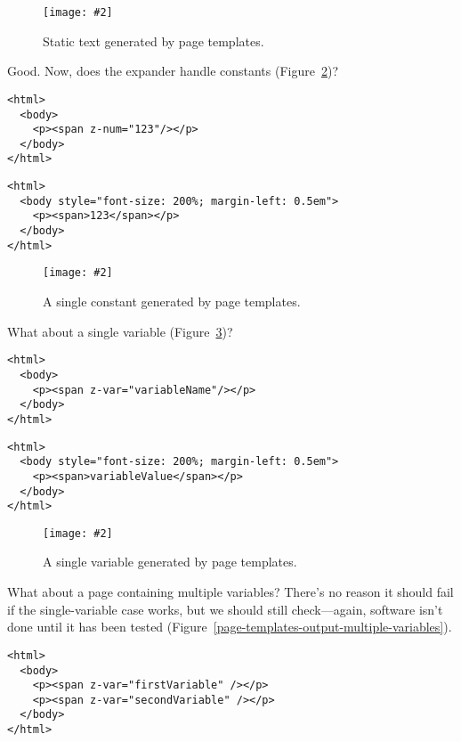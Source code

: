 \documentclass[krantzl]{krantz}
\newcommand{\figpdf}[4]{\begin{figure}%
\centering%
\texttt{[image: \#2]}%
\caption{#3}%
\label{#1}%
\end{figure}}
\newcommand{\figref}[1]{Figure~\ref{#1}}
\begin{document}
\figpdf{page-templates-output-static-text}{./page-templates/output-static-text.pdf}{Static text generated by page templates.}{0.6}


Good.
Now, does the expander handle constants (\figref{page-templates-output-single-constant})?


\begin{lstlisting}[frame=single,frameround=tttt]
<html>
  <body>
    <p><span z-num="123"/></p>
  </body>
</html>
\end{lstlisting}



\begin{lstlisting}[frame=single,frameround=tttt]
<html>
  <body style="font-size: 200%; margin-left: 0.5em">
    <p><span>123</span></p>
  </body>
</html>
\end{lstlisting}


\figpdf{page-templates-output-single-constant}{./page-templates/output-single-constant.pdf}{A single constant generated by page templates.}{0.6}


What about a single variable (\figref{page-templates-output-single-variable})?


\begin{lstlisting}[frame=single,frameround=tttt]
<html>
  <body>
    <p><span z-var="variableName"/></p>
  </body>
</html>
\end{lstlisting}



\begin{lstlisting}[frame=single,frameround=tttt]
<html>
  <body style="font-size: 200%; margin-left: 0.5em">
    <p><span>variableValue</span></p>
  </body>
</html>
\end{lstlisting}


\figpdf{page-templates-output-single-variable}{./page-templates/output-single-variable.pdf}{A single variable generated by page templates.}{0.6}


What about a page containing multiple variables?
There's no reason it should fail if the single-variable case works,
but we should still check---again,
software isn't done until it has been tested (\figref{page-templates-output-multiple-variables}).


\begin{lstlisting}[frame=single,frameround=tttt]
<html>
  <body>
    <p><span z-var="firstVariable" /></p>
    <p><span z-var="secondVariable" /></p>
  </body>
</html>
\end{lstlisting}
\end{document}
